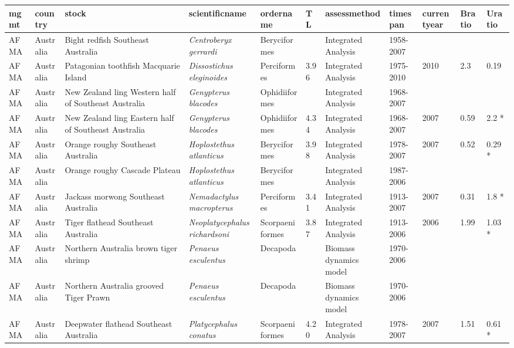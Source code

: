 \begin{longtable}{p{1.5cm}p{1.5cm}p{3cm}p{3cm}p{2.5cm}p{0.9cm}p{1.4cm}p{0.9cm}p{0.9cm}p{0.9cm}p{1cm}}
  \hline
mgmt & country & stock & scientificname & ordername & TL & assessmethod & timespan & currentyear & Bratio & Uratio \\ 
  \hline
AFMA & Australia & Bight redfish Southeast Australia & \textit{Centroberyx gerrardi} & Beryciformes &  & Integrated Analysis & 1958-2007 &  &  &  \\ 
  AFMA & Australia & Patagonian toothfish Macquarie Island & \textit{Dissostichus eleginoides} & Perciformes & 3.96 & Integrated Analysis & 1975-2010 & 2010 & 2.3 & 0.19 \\ 
  AFMA & Australia & New Zealand ling Western half of Southeast Australia & \textit{Genypterus blacodes} & Ophidiiformes &  & Integrated Analysis & 1968-2007 &  &  &  \\ 
  AFMA & Australia & New Zealand ling Eastern half of Southeast Australia & \textit{Genypterus blacodes} & Ophidiiformes & 4.34 & Integrated Analysis & 1968-2007 & 2007 & 0.59 & 2.2 * \\ 
  AFMA & Australia & Orange roughy Southeast Australia & \textit{Hoplostethus atlanticus} & Beryciformes & 3.98 & Integrated Analysis & 1978-2007 & 2007 & 0.52 & 0.29 * \\ 
  AFMA & Australia & Orange roughy Cascade Plateau & \textit{Hoplostethus atlanticus} & Beryciformes &  & Integrated Analysis & 1987-2006 &  &  &  \\ 
  AFMA & Australia & Jackass morwong Southeast Australia & \textit{Nemadactylus macropterus} & Perciformes & 3.41 & Integrated Analysis & 1913-2007 & 2007 & 0.31 & 1.8 * \\ 
  AFMA & Australia & Tiger flathead Southeast Australia & \textit{Neoplatycephalus richardsoni} & Scorpaeniformes & 3.87 & Integrated Analysis & 1913-2006 & 2006 & 1.99 & 1.03 * \\ 
  AFMA & Australia & Northern Australia brown tiger shrimp & \textit{Penaeus esculentus} & Decapoda &  & Biomass dynamics model & 1970-2006 &  &  &  \\ 
  AFMA & Australia & Northern Australia grooved Tiger Prawn & \textit{Penaeus esculentus} & Decapoda &  & Biomass dynamics model & 1970-2006 &  &  &  \\ 
  AFMA & Australia & Deepwater flathead Southeast Australia & \textit{Platycephalus conatus} & Scorpaeniformes & 4.20 & Integrated Analysis & 1978-2007 & 2007 & 1.51 & 0.61 * \\ 

\end{longtable}
